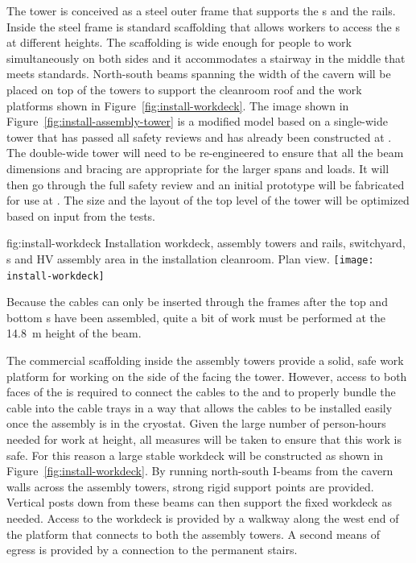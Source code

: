 The  tower is conceived as a steel outer frame that supports the s and the rails. Inside the steel frame is standard scaffolding that allows workers to access the s at different heights. 
The scaffolding is wide enough for people to work simultaneously on both sides and it accommodates a stairway in the middle that meets  standards. 
North-south beams spanning the width of the cavern will be placed on top of the towers to support the cleanroom roof and the work platforms shown in Figure~\ref{fig:install-workdeck}.
The image shown in Figure~\ref{fig:install-assembly-tower} is a modified model based on a single-wide  tower that has passed all safety reviews and has already been constructed at . 
The double-wide tower will need to be re-engineered to ensure that all the beam dimensions and bracing are appropriate for the larger spans and loads. 
It will then go through the full safety review and an initial prototype 
will be fabricated for use at  . 
The size and the layout of the top level of the tower will be optimized based on input from the   tests. 


\begin{dunefigure}{fig:install-workdeck}
  {Installation workdeck, assembly towers and  rails, switchyard, \coldbox{}s and HV assembly area in the installation cleanroom. Plan view. 
  }
\texttt{[image: install-workdeck]}
\end{dunefigure}

Because the cables can only be inserted through the  frames after the top and bottom s have been assembled, quite a bit 
of work must be performed at the \SI{14.8}{m} height of the  beam. 

The commercial scaffolding inside the  assembly towers 
provide a solid, safe work platform for working on the side of the  facing the tower. However, access to both faces of the  is required to connect the cables to the  and to properly bundle the cable into the cable trays in a way that allows the cables to be installed easily once the assembly is in the cryostat. 
Given the large number of person-hours needed for work at height, all measures will be taken to ensure that this work is safe. 
For this reason a large stable  workdeck will be constructed as shown in Figure~\ref{fig:install-workdeck}.
By running north-south I-beams from the cavern walls across the assembly towers, strong rigid support points are provided. 
Vertical posts down from these beams can then support the fixed workdeck as needed. Access to the workdeck is provided by a walkway along the west end of the platform that connects to both the assembly towers. A second means of egress is provided by a connection to the permanent stairs. 



